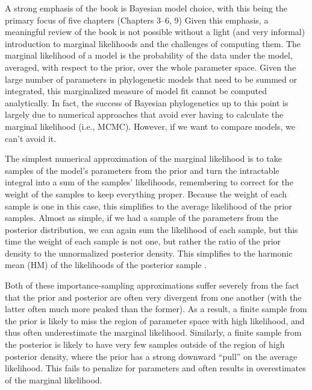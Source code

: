 \documentclass[letterpaper,12pt]{article}
\begin{document}
A strong emphasis of the book is Bayesian model choice,
with this being the primary focus of five chapters (Chapters 3--6, 9)
Given this emphasis, a meaningful review of the book is not possible without a
light (and very informal) introduction to marginal likelihoods and the
challenges of computing them.
The marginal likelihood of a model is the probability of the data under the
model, averaged, with respect to the prior, over the whole parameter space.
Given the large number of parameters in phylogenetic models that need
to be summed or integrated, this marginalized measure of model fit cannot
be computed analytically.
In fact, the success of Bayesian phylogenetics up to this point is largely due
to numerical approaches that avoid ever having to calculate the marginal
likelihood (i.e., MCMC).
However, if we want to compare models, we can't avoid it.

The simplest numerical approximation of the marginal likelihood is to take
samples of the model's parameters from the prior and turn the intractable
integral into a sum of the samples' likelihoods, remembering to correct for the
weight of the samples to keep everything proper. Because the weight of each
sample is one in this case, this simplifies to the average likelihood of the
prior samples.
Almost as simple, if we had a sample of the parameters from the posterior
distribution, we can again sum the likelihood of each sample, but this time the
weight of each sample is not one, but rather the ratio of the prior density to
the unnormalized posterior density.
This simplifies to the harmonic mean (HM) of the likelihoods of the posterior
sample \citep{Newton1994}.

Both of these importance-sampling approximations suffer severely from the fact
that the prior and posterior are often very divergent from one another (with
the latter often much more peaked than the former).
As a result, a finite sample from the prior is likely to miss the region of
parameter space with high likelihood, and thus often underestimate the marginal
likelihood.
Similarly, a finite sample from the posterior is likely to have very few
samples outside of the region of high posterior density, where the prior has a
strong downward ``pull'' on the average likelihood. This fails to penalize for
parameters and often results in overestimates of the marginal likelihood.
\end{document}

